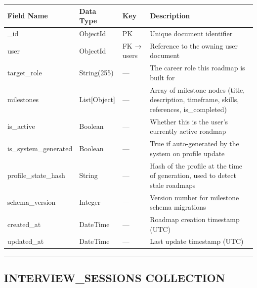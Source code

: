 \documentclass[12pt]{article}
\begin{document}
\begin{longtable}{|p{}|p{}|p{}|p{}|}
\hline
\textbf{Field Name} & \textbf{Data Type} & \textbf{Key} & \textbf{Description} \\ \hline
\endhead
\_id & ObjectId & PK & Unique document identifier \\ \hline
user & ObjectId & FK → users & Reference to the owning user document \\ \hline
target\_role & String(255) & — & The career role this roadmap is built for \\ \hline
milestones & List[Object] & — & Array of milestone nodes (title, description, timeframe, skills, references, is\_completed) \\ \hline
is\_active & Boolean & — & Whether this is the user's currently active roadmap \\ \hline
is\_system\_generated & Boolean & — & True if auto-generated by the system on profile update \\ \hline
profile\_state\_hash & String & — & Hash of the profile at the time of generation, used to detect stale roadmaps \\ \hline
schema\_version & Integer & — & Version number for milestone schema migrations \\ \hline
created\_at & DateTime & — & Roadmap creation timestamp (UTC) \\ \hline
updated\_at & DateTime & — & Last update timestamp (UTC) \\ \hline
\end{longtable}


\noindent\rule{\textwidth}{0.4pt}

\subsection{INTERVIEW\_SESSIONS COLLECTION}
\end{document}
